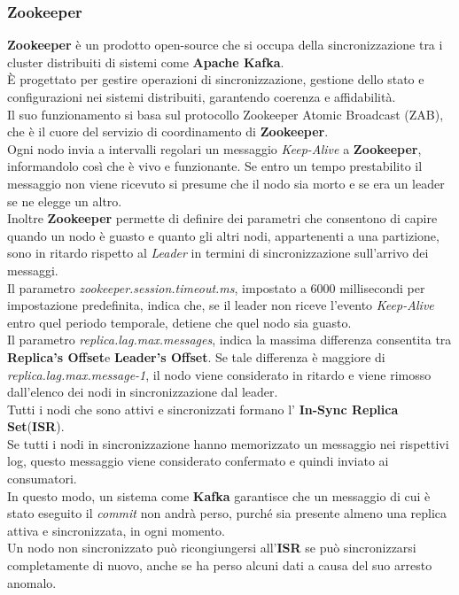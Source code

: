 \subsubsection{Zookeeper}
\textbf{Zookeeper} è un prodotto open-source che si occupa della sincronizzazione tra i cluster distribuiti di sistemi come \textbf{Apache Kafka}. \\
È progettato per gestire operazioni di sincronizzazione, gestione dello stato e configurazioni nei sistemi distribuiti, garantendo coerenza e affidabilità.\\
Il suo funzionamento si basa sul protocollo Zookeeper Atomic Broadcast (ZAB), che è il cuore del servizio di coordinamento di \textbf{Zookeeper}.\\
Ogni nodo invia a intervalli regolari un messaggio \textit{Keep-Alive} a \textbf{Zookeeper}, informandolo così che è vivo e funzionante. Se entro un tempo prestabilito il messaggio non viene ricevuto si presume che il nodo sia
morto e se era un leader se ne elegge un altro.\\
Inoltre \textbf{Zookeeper} permette di definire dei parametri che consentono di capire quando un nodo è guasto e quanto gli altri nodi, appartenenti a una partizione,  sono in ritardo rispetto al \textit{Leader} in termini di sincronizzazione sull'arrivo dei messaggi.\\
Il parametro \textit{zookeeper.session.timeout.ms}, impostato a 6000 millisecondi per impostazione predefinita, indica che, se il leader non riceve l'evento \textit{Keep-Alive} entro quel periodo temporale, detiene che quel nodo sia guasto.\\
Il parametro \textit{replica.lag.max.messages}, indica la massima differenza consentita tra \textbf{Replica's Offset}e \textbf{Leader's Offset}. Se tale differenza è maggiore di \textit{replica.lag.max.message-1}, il nodo viene considerato in ritardo e viene rimosso dall'elenco dei nodi in sincronizzazione dal leader. \\
Tutti i nodi che sono attivi e sincronizzati formano l' \textbf{In-Sync Replica Set}(\textbf{ISR}).\\
Se tutti i nodi in sincronizzazione hanno memorizzato un messaggio nei rispettivi \gls{log}{}, questo messaggio viene considerato confermato e quindi inviato ai consumatori. \\
In questo modo, un sistema come \textbf{Kafka} garantisce che un messaggio di cui è stato eseguito il \textit{commit} non andrà perso, purché sia presente almeno una replica attiva e sincronizzata, in ogni momento.\\
Un nodo non sincronizzato può ricongiungersi all'\textbf{ISR} se può sincronizzarsi completamente di nuovo, anche se ha perso alcuni dati a causa del suo arresto anomalo.
